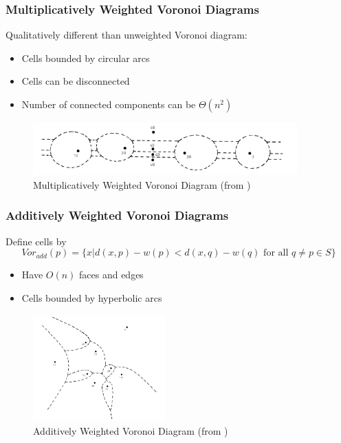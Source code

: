 \documentclass{beamer}
\begin{document}
\begin{frame}
  \frametitle{Multiplicatively Weighted Voronoi Diagrams}

  Qualitatively different than unweighted Voronoi diagram:
  \begin{itemize}
    \item Cells bounded by circular arcs
    \item Cells can be disconnected
    \item Number of connected components can be $\Theta(n^2)$
  \end{itemize}

  \begin{figure}
    \includegraphics[width=4in]{mul(aur_surv).png}
    \caption{\footnotesize Multiplicatively Weighted Voronoi Diagram (from \cite{aurenhammer_survey})}
  \end{figure}

\end{frame}

\begin{frame}
  \frametitle{Additively Weighted Voronoi Diagrams}

  Define cells by
  \[ Vor_{add}(p) = \{ x | d(x,p) - w(p) < d(x,q) - w(q) \text{ for all } q \neq p \in S \} \]

  \begin{itemize}
    \item Have $O(n)$ faces and edges
    \item Cells bounded by hyperbolic arcs
  \end{itemize}

  \begin{figure}
    \includegraphics[width=2in]{weighted(aur_surv).png}
    \caption{Additively Weighted Voronoi Diagram (from \cite{aurenhammer_survey})}
  \end{figure}

\end{frame}
\end{document}
